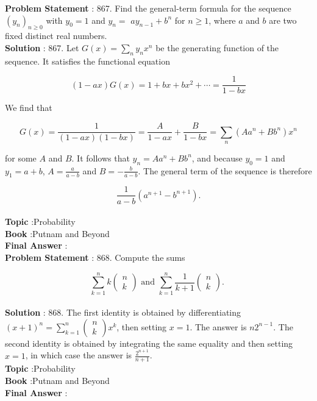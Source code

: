 \documentclass[10pt]{article}
\begin{document}
\textbf{Problem Statement} :
867. Find the general-term formula for the sequence $\left(y_{n}\right)_{n \geq 0}$ with $y_{0}=1$ and $y_{n}=$ $a y_{n-1}+b^{n}$ for $n \geq 1$, where $a$ and $b$ are two fixed distinct real numbers.
\\
\textbf{Solution} :
867. Let $G(x)=\sum_{n} y_{n} x^{n}$ be the generating function of the sequence. It satisfies the functional equation

$$
(1-a x) G(x)=1+b x+b x^{2}+\cdots=\frac{1}{1-b x}
$$

We find that

$$
G(x)=\frac{1}{(1-a x)(1-b x)}=\frac{A}{1-a x}+\frac{B}{1-b x}=\sum_{n}\left(A a^{n}+B b^{n}\right) x^{n}
$$

for some $A$ and $B$. It follows that $y_{n}=A a^{n}+B b^{n}$, and because $y_{0}=1$ and $y_{1}=a+b$, $A=\frac{a}{a-b}$ and $B=-\frac{b}{a-b}$. The general term of the sequence is therefore

$$
\frac{1}{a-b}\left(a^{n+1}-b^{n+1}\right) .
$$
\\
\textbf{Topic} :Probability\\
\textbf{Book} :Putnam and Beyond\\
\textbf{Final Answer} :\\


\textbf{Problem Statement} :
868. Compute the sums

$$
\sum_{k=1}^{n} k\left(\begin{array}{l}
n \\
k
\end{array}\right) \text { and } \sum_{k=1}^{n} \frac{1}{k+1}\left(\begin{array}{l}
n \\
k
\end{array}\right) \text {. }
$$
\\
\textbf{Solution} :
868. The first identity is obtained by differentiating $(x+1)^{n}=\sum_{k=1}^{n}\left(\begin{array}{c}n \\ k\end{array}\right) x^{k}$, then setting $x=1$. The answer is $n 2^{n-1}$. The second identity is obtained by integrating the same equality and then setting $x=1$, in which case the answer is $\frac{2^{n+1}}{n+1}$.
\\
\textbf{Topic} :Probability\\
\textbf{Book} :Putnam and Beyond\\
\textbf{Final Answer} :\\
\end{document}
